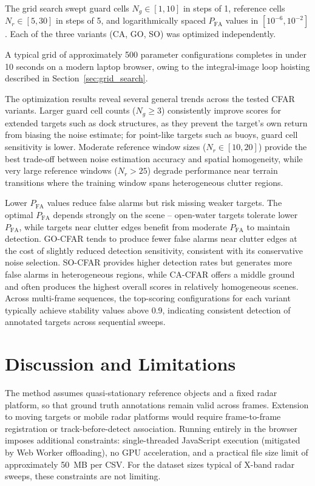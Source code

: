 \documentclass[conf]{new-aiaa}
\begin{document}
The grid search swept guard cells $N_g \in [1, 10]$ in steps of 1, reference cells $N_r \in [5, 30]$ in steps of 5, and logarithmically spaced $P_{\mathrm{FA}}$ values in $[10^{-6}, 10^{-2}]$. Each of the three variants (CA, GO, SO) was optimized independently.

A typical grid of approximately 500 parameter configurations completes in under 10 seconds on a modern laptop browser, owing to the integral-image loop hoisting described in Section~\ref{sec:grid_search}.


The optimization results reveal several general trends across the tested CFAR variants. Larger guard cell counts ($N_g \geq 3$) consistently improve scores for extended targets such as dock structures, as they prevent the target's own return from biasing the noise estimate; for point-like targets such as buoys, guard cell sensitivity is lower. Moderate reference window sizes ($N_r \in [10, 20]$) provide the best trade-off between noise estimation accuracy and spatial homogeneity, while very large reference windows ($N_r > 25$) degrade performance near terrain transitions where the training window spans heterogeneous clutter regions.

Lower $P_{\mathrm{FA}}$ values reduce false alarms but risk missing weaker targets. The optimal $P_{\mathrm{FA}}$ depends strongly on the scene -- open-water targets tolerate lower $P_{\mathrm{FA}}$, while targets near clutter edges benefit from moderate $P_{\mathrm{FA}}$ to maintain detection. GO-CFAR tends to produce fewer false alarms near clutter edges at the cost of slightly reduced detection sensitivity, consistent with its conservative noise selection. SO-CFAR provides higher detection rates but generates more false alarms in heterogeneous regions, while CA-CFAR offers a middle ground and often produces the highest overall scores in relatively homogeneous scenes. Across multi-frame sequences, the top-scoring configurations for each variant typically achieve stability values above 0.9, indicating consistent detection of annotated targets across sequential sweeps.

\section{Discussion and Limitations}

The method assumes quasi-stationary reference objects and a fixed radar platform, so that ground truth annotations remain valid across frames. Extension to moving targets or mobile radar platforms would require frame-to-frame registration or track-before-detect association. Running entirely in the browser imposes additional constraints: single-threaded JavaScript execution (mitigated by Web Worker offloading), no GPU acceleration, and a practical file size limit of approximately 50~MB per CSV. For the dataset sizes typical of X-band radar sweeps, these constraints are not limiting.
\end{document}
